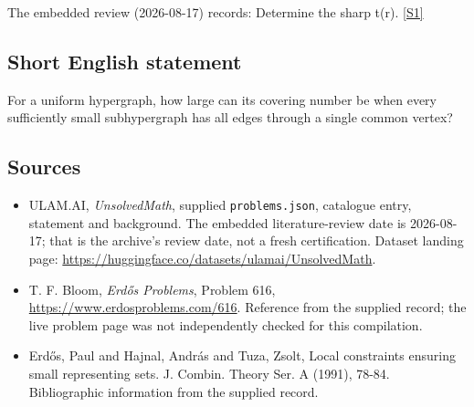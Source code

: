 \documentclass[11pt,a4paper]{article}
\newcommand{\sref}[2]{\hyperlink{source:#1:#2}{[S#2]}}
\begin{document}
The embedded review (2026-08-17) records: Determine the sharp t(r). \sref{statement}{1}

\subsection{Short English statement}

For a uniform hypergraph, how large can its covering number be when every sufficiently small subhypergraph has all edges through a single common vertex?

\subsection{Sources}

{\small

\begin{itemize}

\item[\hypertarget{source:statement:1}{S1}] ULAM.AI, \emph{UnsolvedMath}, supplied \texttt{problems.json}, catalogue entry, statement and background. The embedded literature-review date is 2026-08-17; that is the archive’s review date, not a fresh certification. Dataset landing page: \url{https://huggingface.co/datasets/ulamai/UnsolvedMath}.

\item[\hypertarget{source:statement:2}{S2}] T. F. Bloom, \emph{Erdős Problems}, Problem 616, \url{https://www.erdosproblems.com/616}. Reference from the supplied record; the live problem page was not independently checked for this compilation.

\item[\hypertarget{source:statement:3}{S3}] Erd\H{o}s, Paul and Hajnal, Andr\'{a}s and Tuza, Zsolt, Local constraints ensuring small representing sets. J. Combin. Theory Ser. A (1991), 78-84. Bibliographic information from the supplied record.

\end{itemize}

}

\label{end:statement}
\end{document}
